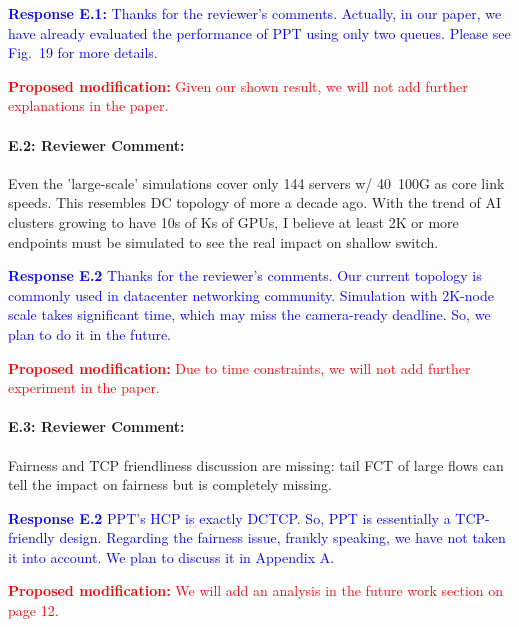 \documentclass[12pt,one-column]{article}
\begin{document}
\noindent\textcolor{blue}{\textbf{Response E.1:}
Thanks for the reviewer’s comments. 
Actually, in our paper, we have already evaluated the performance of PPT using only two queues. Please see Fig.~19 for more details.
}

\noindent\textcolor{red}{\textbf{Proposed modification: }
Given our shown result, we will not add further explanations in the paper.
}

{\it \paragraph{E.2: Reviewer Comment:} Even the 'large-scale' simulations cover only 144 servers w/ 40~100G as core link speeds. This resembles DC topology of more a decade ago. With the trend of AI clusters growing to have 10s of Ks of GPUs, I believe at least 2K or more endpoints must be simulated to see the real impact on shallow switch.}

\noindent\textcolor{blue}{\textbf{Response E.2}
Thanks for the reviewer’s comments. 
Our current topology is commonly used in datacenter networking community.
Simulation with 2K-node scale takes significant time, which may miss the camera-ready deadline.  So, we plan to do it in the future.
} 

\noindent\textcolor{red}{\textbf{Proposed modification: }
Due to time constraints, we will not add further experiment in the paper.
}

{\it \paragraph{E.3: Reviewer Comment:} Fairness and TCP friendliness discussion are missing: tail FCT of large flows can tell the impact on fairness but is completely missing.}

\noindent\textcolor{blue}{\textbf{Response E.2}
PPT's HCP is exactly DCTCP. So, PPT is essentially a TCP-friendly design.
Regarding the fairness issue, frankly speaking, we have not taken it into account.
We plan to discuss it in Appendix A.
} 

\noindent\textcolor{red}{\textbf{Proposed modification: }
	We will add an analysis in the future work section on page 12.
}






%
%
\end{document}

